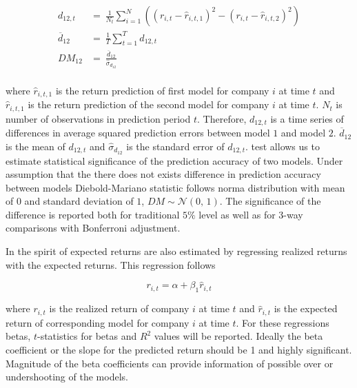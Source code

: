 \documentclass[12pt]{article}
\begin{document}
\begin{equation}
\label{eq:Diebold-Mariano}
\begin{split}
 d_{12, t} 			& = \ \frac{1}{N_{t}}  \sum^N_{i=1}((r_{i, t} - \hat r_{i, t, 1})^2 - (r_{i, t} - \hat r_{i, t, 2})^2) \\
\overline{d}_{12} 	& = \ \frac{1}{T} \sum^T_{t=1} d_{12, t} \\
DM_{12} 			& = \ \frac{\overline{d}_{12}}{\hat \sigma_{d_{12}}} \\
\end{split}
\end{equation}

where $\hat r_{i, t, 1}$ is the return prediction of first model for company $i$ at time $t$ and $\hat r_{i, t, 1}$ is the return prediction of the second model  for company $i$ at time $t$. $N_t$ is number of observations in prediction period $t$. Therefore, $d_{12, t}$ is a time series of differences in average squared prediction errors between model $1$ and model $2$. $\overline{d}_{12}$ is the mean of $d_{12, t}$ and $\hat \sigma_{d_{12}}$ is the \citet{Newey1987} standard error of $d_{12, t}$. \citet{Diebold1995} test allows us to estimate statistical significance of the prediction accuracy of two models. Under assumption that the there does not exists difference in prediction accuracy between models Diebold-Mariano statistic follows norma distribution with mean of $0$ and standard deviation of $1$, $DM \sim \mathcal{N}(0,\, 1)$. The significance of the difference is reported both for traditional $5\%$ level as well as for 3-way comparisons with Bonferroni adjustment. \par

In the spirit of \citet{Lewellen2015} expected returns are also estimated by regressing realized returns with the expected returns. This regression follows \par

\begin{equation}
\label{eq:realizedRegression}
r_{i, t} = \alpha + \beta_1 \hat r_{i, t}
\end{equation}

where $r_{i, t}$ is the realized return of company $i$ at time $t$ and $\hat r_{i, t}$ is the expected return of corresponding model for company $i$ at time $t$. For these regressions betas, $t$-statistics for betas and $R^2$ values will be reported. Ideally the beta coefficient or the slope for the predicted return should be 1 and highly significant. Magnitude of the beta coefficients can provide information of possible over or undershooting of the models. \par
\end{document}
